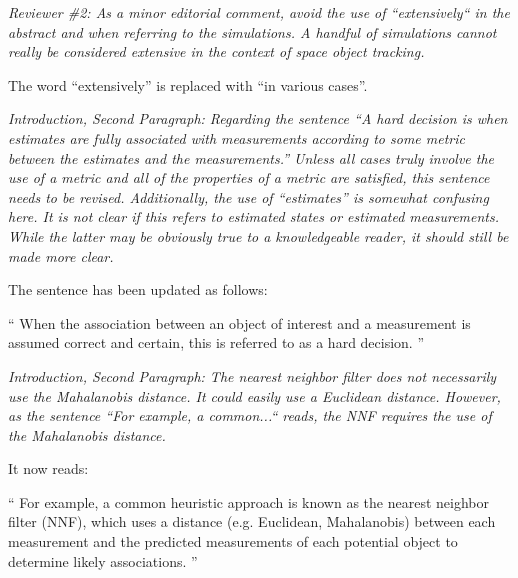 \documentclass[11pt]{article}
\newenvironment{correction}{\begin{list}{}{\setlength{\leftmargin}{1cm}\setlength{\rightmargin}{1cm}}\vspace{\parsep}\item[]``}{''\end{list}}
\begin{document}
\setlength{\leftmargini}{0pt}
\begin{itemize}\setlength{\itemsep}{2\parsep}

\item {\itshape Reviewer \#2: As a minor editorial comment, avoid the use of ``extensively`` in the abstract and when referring to the simulations.  A handful of simulations cannot really be considered extensive in the context of space object tracking.}

The word ``extensively'' is replaced with ``in various cases''.


\item {\itshape Introduction, Second Paragraph:
Regarding the sentence ``A hard decision is when estimates are fully associated with measurements according to some metric between the estimates and the measurements.''  Unless all cases truly involve the use of a metric and all of the properties of a metric are satisfied, this sentence needs to be revised.  Additionally, the use of ``estimates'' is somewhat confusing here.  It is not clear if this refers to estimated states or estimated measurements.  While the latter may be obviously true to a knowledgeable reader, it should still be made more clear.}

The sentence has been updated as follows:
\begin{correction}
When the association between an object of interest and a measurement is assumed correct and certain, this is referred to as a hard decision.
\end{correction}

%

\item {\itshape Introduction, Second Paragraph:
The nearest neighbor filter does not necessarily use the Mahalanobis distance.  It could easily use a Euclidean distance.  However, as the sentence ``For example, a common...`` reads, the NNF requires the use of the Mahalanobis distance.}


It now reads:
\begin{correction}
For example, a common heuristic approach is known as the nearest neighbor filter (NNF), which uses a distance (e.g. Euclidean, Mahalanobis) between each measurement and the predicted measurements of each potential object to determine likely associations.
\end{correction}



\end{itemize}
\end{document}

